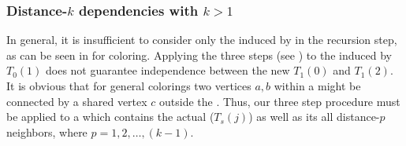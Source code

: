 \subsubsection{Distance-$k$ dependencies with $k>1$}  \label{subsec:Dk_dependency}

In general, it is insufficient to consider only
the \subgraphs induced by \levelGroups in the recursion step, as can be seen in
 for \DTWO coloring. Applying the three steps (see
) to the
\subgraph induced by $T_0(1)$ does not guarantee \DTWO independence between the
new \levelGroups $T_1(0)$ and $T_1(2)$. It is obvious that for general \DK
colorings two vertices $a,b$ within a \levelGroup might be connected by a shared
vertex $c$ outside the \levelGroup.  Thus, our three step procedure must be
applied to a \subgraph which contains the actual \levelGroup ($T_s(j)$) as well
as its all distance-$p$ neighbors, where $p=1,2,\ldots,(k-1)$.
